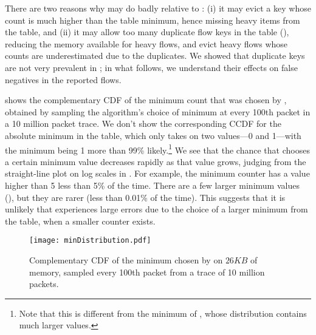 There are two reasons why \TheSystem may do badly relative to \spacesaving: (i)
it may evict a key whose count is much higher than the table minimum, hence
missing heavy items from the table, and (ii) it may allow too many duplicate
flow keys in the table (), reducing the memory available
for heavy flows, and evict heavy flows whose counts are underestimated due to
the duplicates. We showed that duplicate keys are not very prevalent in
; in what follows, we understand their effects on false
negatives in the reported flows.

 shows the complementary CDF of the minimum count that was chosen
by \TheSystem, obtained by sampling the algorithm's choice of minimum at every
100th packet in a 10 million packet trace. We don't show the corresponding CCDF
for the absolute minimum in the table, which only takes on two values---0 and
1---with the minimum being 1 more than 99\% likely.\footnote{Note that this is
  different from the minimum of \spacesaving, whose distribution contains much
  larger values.}
%
We see that the chance that \TheSystem chooses a certain minimum value decreases
rapidly as that value grows, judging from the straight-line plot on log scales
in .
%
For example, the minimum counter has a value higher than 5 less than 5\% of the
time. There are a few larger minimum values (), but they are rarer (less
than 0.01\% of the time). This suggests that it is unlikely that \TheSystem
experiences large errors due to the choice of a larger minimum from the table,
when a smaller counter exists.

\begin{figure}[h]
\texttt{[image: minDistribution.pdf]}
\caption{Complementary CDF of the minimum chosen by \TheSystem on $26KB$ of
  memory, sampled every 100th packet from a trace of 10 million packets.}
\label{fig:mindist}
\end{figure}

